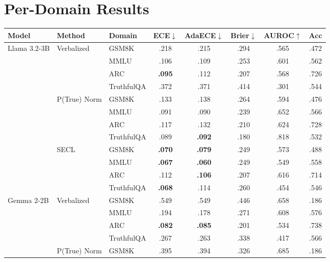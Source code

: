 \newpage
\onecolumn
\section{Per-Domain Results} \label{app:per_domain}

\begin{table}[ht]
\centering
\footnotesize
\begin{tabular}{lllccccc}
\toprule
\textbf{Model} & \textbf{Method} & \textbf{Domain} & \textbf{ECE}$\downarrow$ & \textbf{AdaECE}$\downarrow$ & \textbf{Brier}$\downarrow$ & \textbf{AUROC}$\uparrow$ & \textbf{Acc} \\
\midrule
\multirow{12}{*}{Llama 3.2-3B} & \multirow{4}{*}{Verbalized} 
  & GSM8K      & .218 & .215 & .294 & .565 & .472 \\
& & MMLU       & .106 & .109 & .253 & .601 & .562 \\
& & ARC        & \textbf{.095} & .112 & .207 & .568 & .726 \\
& & TruthfulQA & .372 & .371 & .414 & .301 & .544 \\
\cmidrule{2-8}
& \multirow{4}{*}{P(True) Norm} 
  & GSM8K      & .133 & .138 & .264 & .594 & .476 \\
& & MMLU       & .091 & .090 & .239 & .652 & .566 \\
& & ARC        & .117 & .132 & .210 & .624 & .728 \\
& & TruthfulQA & .089 & \textbf{.092} & .180 & .818 & .532 \\
\cmidrule{2-8}
& \multirow{4}{*}{SECL} 
  & GSM8K      & \textbf{.070} & \textbf{.079} & .249 & .573 & .488 \\
& & MMLU       & \textbf{.067} & \textbf{.060} & .249 & .549 & .558 \\
& & ARC        & .112 & \textbf{.106} & .207 & .616 & .714 \\
& & TruthfulQA & \textbf{.068} & .114 & .260 & .454 & .546 \\
\midrule
\multirow{12}{*}{Gemma 2-2B} & \multirow{4}{*}{Verbalized} 
  & GSM8K      & .549 & .549 & .446 & .658 & .186 \\
& & MMLU       & .194 & .178 & .271 & .608 & .576 \\
& & ARC        & \textbf{.082} & \textbf{.085} & .201 & .534 & .738 \\
& & TruthfulQA & .267 & .263 & .338 & .417 & .566 \\
\cmidrule{2-8}
& \multirow{4}{*}{P(True) Norm} 
  & GSM8K      & .395 & .394 & .326 & .685 & .186 \\

\end{tabular}
\end{table}
